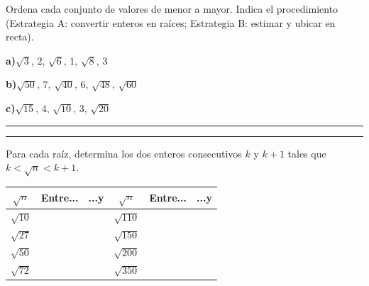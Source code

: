 \documentclass[11pt, letterpaper]{article}
\newcommand{\espacio}[1]{%
  \par\vspace{5pt}%
  \noindent\textcolor{zenitnavy!22}{\rule{\linewidth}{1.2pt}}%
  \par\vspace{#1}%
  \noindent\textcolor{zenitnavy!22}{\rule{\linewidth}{1.2pt}}%
  \par\vspace{5pt}%
  \noindent{\small\textbf{Respuesta:}\;\rule{7cm}{0.35pt}}%
  \par\vspace{2mm}}
\begin{document}
\vspace{6pt}

\begin{tcolorbox}[ejmedio,
  title={Ejercicio 7 \hfill $\bigstar\bigstar$ \quad Ordenar de menor a mayor}]

Ordena cada conjunto de valores de menor a mayor. Indica el procedimiento (Estrategia A: convertir enteros en raíces; Estrategia B: estimar y ubicar en recta).

\medskip

\noindent\textbf{a)}\quad $\sqrt{3}$,\; $2$,\; $\sqrt{6}$,\; $1$,\; $\sqrt{8}$,\; $3$

\medskip

\noindent\textbf{b)}\quad $\sqrt{50}$,\; $7$,\; $\sqrt{40}$,\; $6$,\; $\sqrt{48}$,\; $\sqrt{60}$

\medskip

\noindent\textbf{c)}\quad $\sqrt{15}$,\; $4$,\; $\sqrt{10}$,\; $3$,\; $\sqrt{20}$

\espacio{6.5cm}
\end{tcolorbox}

\vspace{6pt}

\begin{tcolorbox}[ejmedio,
  title={Ejercicio 8 \hfill $\bigstar\bigstar$ \quad Acotar entre enteros consecutivos}]

Para cada raíz, determina los dos enteros consecutivos $k$ y $k+1$ tales que $k<\sqrt{n}<k+1$.

\medskip

\begin{center}
\renewcommand{\arraystretch}{2.0}
\begin{tabular}{|c|c|c||c|c|c|}
\hline
$\sqrt{n}$ & \textbf{Entre...} & \textbf{...y} & $\sqrt{n}$ & \textbf{Entre...} & \textbf{...y}\\
\hline
$\sqrt{10}$ & & & $\sqrt{110}$ & &\\
\hline
$\sqrt{27}$ & & & $\sqrt{150}$ & &\\
\hline
$\sqrt{50}$ & & & $\sqrt{200}$ & &\\
\hline
$\sqrt{72}$ & & & $\sqrt{350}$ & &\\
\hline
\end{tabular}
\end{center}
\end{tcolorbox}

\clearpage
\end{document}
